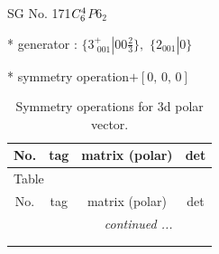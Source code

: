 \documentclass[fleqn,8pt]{jsarticle}
\begin{document}
\setcounter{MaxMatrixCols}{32}

\renewcommand{\tablename}{Table~}
\renewcommand{\figurename}{Figure~}
\begin{center}
\LARGE
SG No. 171\quad$C_{\rm 6}^{4}$\quad$P6_2$\quad[ hexagonal ]
\end{center}

* generator : $\{3^{+}_{\,\,001}|0 0 \frac{2}{3}\},\,\,\{2{}_{001}|0\}$

* symmetry operation\quad$+\left[ 0,\, 0,\, 0 \right]$
\renewcommand{\arraystretch}{1.3}
\begin{longtable}{cccc}
\caption{Symmetry operations for 3d polar vector.}
 \\
 \hline \hline
No. & tag & matrix (polar) & det \\ \hline \endfirsthead

\multicolumn{3}{l}{\tablename\ \thetable{}} \\
 \hline \hline
No. & tag & matrix (polar) & det \\ \hline \endhead

 \hline \hline
\multicolumn{3}{r}{\footnotesize\it continued ...} \\ \endfoot

 \hline \hline
\multicolumn{3}{r}{} \\ \endlastfoot


\end{longtable}
\end{document}
